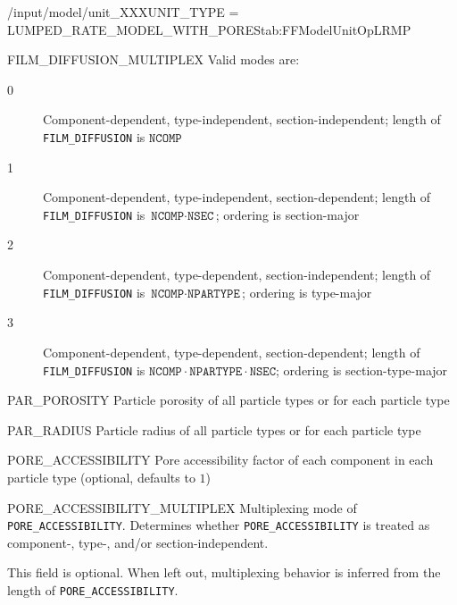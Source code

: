 \begin{condsubgroup}{/input/model/unit\_XXX}{UNIT\_TYPE = LUMPED\_RATE\_MODEL\_WITH\_PORES}{tab:FFModelUnitOpLRMP}
\begin{dataset}[unit=--,type=int,range={$\{0, \dots, 3 \}$},length={1}]{FILM\_DIFFUSION\_MULTIPLEX}
    Valid modes are:
    \begin{description}
      \item[0] Component-dependent, type-independent, section-independent; length of \texttt{FILM\_DIFFUSION} is $\texttt{NCOMP}$
      \item[1] Component-dependent, type-independent, section-dependent; length of \texttt{FILM\_DIFFUSION} is $\texttt{NCOMP} \cdot \texttt{NSEC}$; ordering is section-major
      \item[2] Component-dependent, type-dependent, section-independent; length of \texttt{FILM\_DIFFUSION} is $\texttt{NCOMP} \cdot \texttt{NPARTYPE}$; ordering is type-major
      \item[3] Component-dependent, type-dependent, section-dependent; length of \texttt{FILM\_DIFFUSION} is $\texttt{NCOMP} \cdot \texttt{NPARTYPE} \cdot \texttt{NSEC}$; ordering is section-type-major
    \end{description}\vspace{-\baselineskip}
  \end{dataset}
  \begin{dataset}[unit=--,type=double,range={$(0,1]$},length={$1$ / \texttt{NPARTYPE}}]{PAR\_POROSITY}
    Particle porosity of all particle types or for each particle type
  \end{dataset}
  \begin{dataset}[unit=\si{\metre},type=double,range={$>0$},length={$1$ / \texttt{NPARTYPE}}]{PAR\_RADIUS}
    Particle radius of all particle types or for each particle type
  \end{dataset}
  \begin{dataset}[unit=--,type=double,range={$(0, 1]$},length={see \texttt{PORE\_ACCESSIBILITY\_MULTIPLEX}}]{PORE\_ACCESSIBILITY}
    Pore accessibility factor of each component in each particle type (optional, defaults to $1$)
  \end{dataset}
  \begin{dataset}[unit=--,type=int,range={$\{0, \dots, 3 \}$},length={1}]{PORE\_ACCESSIBILITY\_MULTIPLEX}
    Multiplexing mode of \texttt{PORE\_ACCESSIBILITY}.
    Determines whether \texttt{PORE\_ACCESSIBILITY} is treated as component-, type-, and/or section-independent.

    This field is optional.
    When left out, multiplexing behavior is inferred from the length of \texttt{PORE\_ACCESSIBILITY}.


\end{dataset}
\end{condsubgroup}

